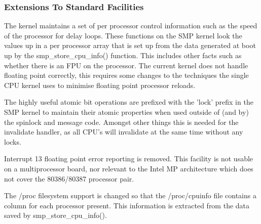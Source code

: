 \documentclass[]{article}
\begin{document}
\subsubsection{Extensions To Standard Facilities}
The kernel maintains a set of per processor control information such as 
the speed of the processor for delay loops. These functions on the SMP 
kernel look the values up in a per processor array that is set up from the 
data generated at boot up by the smp\_store\_cpu\_info() function. This 
includes other facts such as whether there is an FPU on the processor. The 
current kernel does not handle floating point correctly, this requires some 
changes to the techniques the single CPU kernel uses to minimise floating 
point processor reloads.

The highly useful atomic bit operations are prefixed with the 'lock' 
prefix in the SMP kernel to maintain their atomic properties when used 
outside of (and by) the spinlock and message code. Amongst other things 
this is needed for the invalidate handler, as all  CPU's will invalidate at 
the same time without any locks.

Interrupt 13 floating point error reporting is removed. This facility is 
not usable on a multiprocessor board, nor relevant to the Intel MP 
architecture which does not cover the 80386/80387 processor pair. \

The /proc filesystem support is changed so that the /proc/cpuinfo file 
contains a column for each processor present. This information is extracted 
from the data saved by smp\_store\_cpu\_info().
\end{document}
